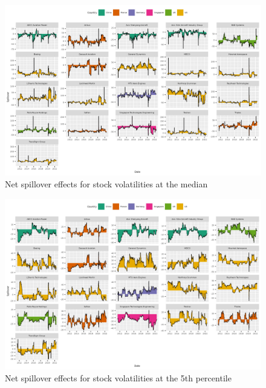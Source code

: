 \documentclass[
  number]{elsarticle}
\begin{document}
\begin{figure}[H]

{\centering \includegraphics{plots/fig-volnet50.png}

}

\caption{\label{fig-volnet50}Net spillover effects for stock
volatilities at the median}

\end{figure}

\begin{figure}[H]

{\centering \includegraphics{plots/fig-volnet5.png}

}

\caption{\label{fig-volnet5}Net spillover effects for stock volatilities
at the 5th percentile}

\end{figure}
\end{document}
